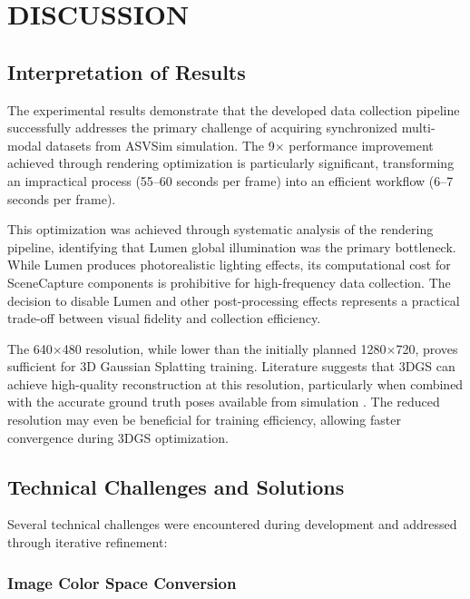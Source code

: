 \clearpage
\section{DISCUSSION}

\subsection{Interpretation of Results}

The experimental results demonstrate that the developed data collection pipeline successfully addresses the primary challenge of acquiring synchronized multi-modal datasets from ASVSim simulation. The 9$\times$ performance improvement achieved through rendering optimization is particularly significant, transforming an impractical process (55--60 seconds per frame) into an efficient workflow (6--7 seconds per frame).

This optimization was achieved through systematic analysis of the rendering pipeline, identifying that Lumen global illumination was the primary bottleneck. While Lumen produces photorealistic lighting effects, its computational cost for SceneCapture components is prohibitive for high-frequency data collection. The decision to disable Lumen and other post-processing effects represents a practical trade-off between visual fidelity and collection efficiency.

The 640$\times$480 resolution, while lower than the initially planned 1280$\times$720, proves sufficient for 3D Gaussian Splatting training. Literature suggests that 3DGS can achieve high-quality reconstruction at this resolution, particularly when combined with the accurate ground truth poses available from simulation \parencite{kerbl20233d}. The reduced resolution may even be beneficial for training efficiency, allowing faster convergence during 3DGS optimization.

\subsection{Technical Challenges and Solutions}

Several technical challenges were encountered during development and addressed through iterative refinement:

\subsubsection{Image Color Space Conversion}

